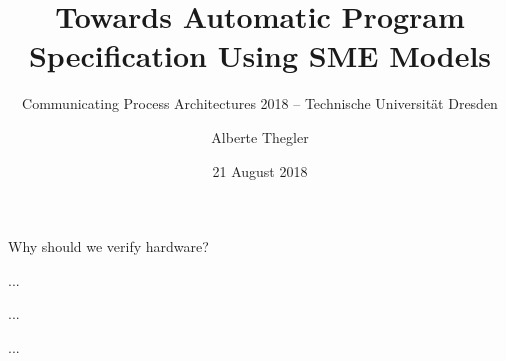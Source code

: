 \documentclass[13pt]{beamer}
\title[Towards Automatic Program Specification \\ Using SME Models]{Towards Automatic Program Specification Using SME Models}
\subtitle{\tiny Communicating Process Architectures 2018 -- Technische Universität Dresden}
\author[A. Thegler]{Alberte Thegler}
\institute[Niels Bohr Institute]{Niels Bohr Institute, University of Copenhagen, Denmark}
\date[August 21]{21 August 2018}
\begin{document}
\frame[plain]{\titlepage}


\begin{frame}{Why should we verify hardware?}
  \begin{block}{}
    ...
  \end{block}

  \pause

  \begin{block}{}
     ...
  \end{block}

  \pause

  \begin{block}{}
    ...
  \end{block}
\end{frame}
\end{document}
